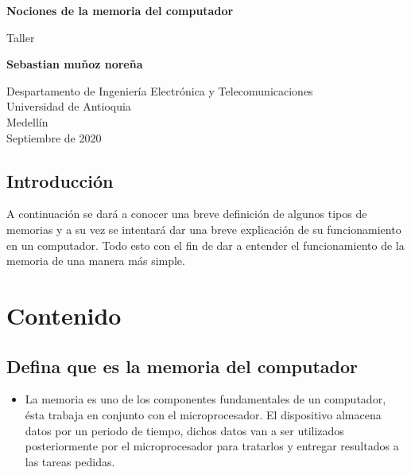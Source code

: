 \documentclass{article}
\begin{document}
\begin{titlepage}
    \begin{center}
        \vspace*{1cm}
            
        \Huge
        \textbf{Nociones de la memoria del computador}
            
        \vspace{0.5cm}
        \LARGE
        Taller
            
        \vspace{1.5cm}
            
        \textbf{Sebastian muñoz noreña}
            
        \vfill
            
        \vspace{0.8cm}
            
        \Large
        Despartamento de Ingeniería Electrónica y Telecomunicaciones\\
        Universidad de Antioquia\\
        Medellín\\
        Septiembre de 2020
            
    \end{center}
\end{titlepage}

\tableofcontents
\pagebreak
\begin{center}
    

\section{Introducción}\end{center}
A continuación se dará a conocer una breve definición de algunos tipos de memorias y a su vez se intentará dar una breve explicación de su funcionamiento en un computador. Todo esto con el fin de dar a entender el funcionamiento de la memoria de una manera más simple.

\pagebreak


\section{Contenido} 
    \subsection{Defina que es la memoria del computador}
         \begin{itemize} \item{}
        La memoria es uno de los componentes fundamentales de un computador, ésta trabaja en conjunto con el microprocesador. El dispositivo almacena datos por un periodo de tiempo, dichos datos van a ser utilizados posteriormente por el microprocesador para tratarlos y entregar resultados a las tareas pedidas.\cite{Referencia}
        \end{itemize} 
\end{document}
